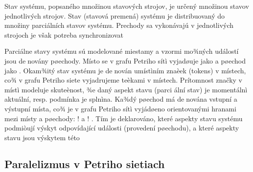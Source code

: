 Stav systému, popsaného množinou stavových strojov, je určený množinou stavov jednotlivých strojov. Stav (stavová premená) systému je distribuovaný do množiny parciálních stavov systému. Prechody sa vykonávajú v jednotlivých strojoch je však potreba synchronizovat

Parciálne stavy systému sú modelované miestamy a vzormi mo¾ných událostí jsou denovány
pøechody. Místo se v grafu Petriho sítì vyjadøuje jako 
 a pøechod jako . Okam¾itý stav
systému je denován umístìním znaèek (tokens) v místech, co¾ v grafu Petriho siete vyjadrujeme
teèkami v místech. Prítomnost značky v místì modeluje skuteènost, ¾e daný aspekt stavu (parci
ální stav) je momentálnì aktuální, resp. podmínka je splnìna. Ka¾dý pøechod má denována
vstupní a výstupní místa, co¾ je v grafu Petriho sítì vyjádøeno orientovanými hranami mezi
místy a pøechody: 
! a !
. Tím je deklarováno, které aspekty stavu systému podmiòují
výskyt odpovídající události (provedení pøechodu), a které aspekty stavu jsou výskytem této

\subsection{Paralelizmus v Petriho sietiach}

